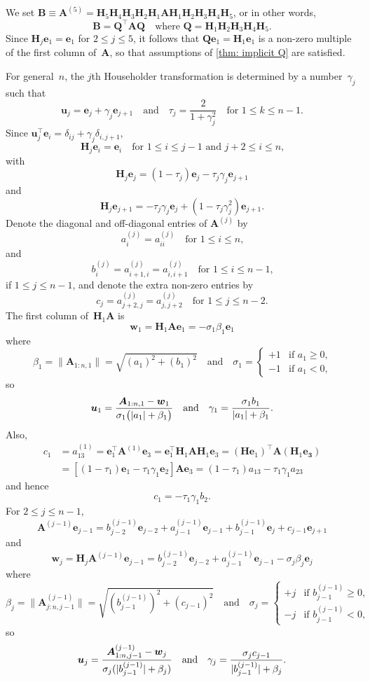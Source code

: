\documentclass[12pt,a4paper]{article}
\newcommand{\bs}[1]{\boldsymbol{#1}}
\begin{document}
We set
$\bs{B}\equiv\bs{A}^{(5)}=\bs{H}_5\bs{H}_4\bs{H}_3\bs{H}_2\bs{H}_1\bs{A}
\bs{H}_1\bs{H}_2\bs{H}_3\bs{H}_4\bs{H}_5$, or in other words,
\[
\bs{B}=\bs{Q}^\top\bs{A}\bs{Q}
	\quad\text{where $\bs{Q}=\bs{H}_1\bs{H}_2\bs{H}_3\bs{H}_4\bs{H}_5$.}
\]
Since $\bs{H}_j\bs{e}_1=\bs{e}_1$ for $2\le j\le 5$, it follows that
$\bs{Q}\bs{e}_1=\bs{H}_1\bs{e}_1$ is a non-zero multiple of the first column 
of~$\bs{A}$, so that assumptions of \cref{thm: implicit Q} are satisfied.

For general~$n$, the $j$th Householder transformation is determined by a
number~$\gamma_j$ such that
\[
\bs{u}_j=\bs{e}_j+\gamma_j\bs{e}_{j+1}
\quad\text{and}\quad
\tau_j=\frac{2}{1+\gamma_j^2}\quad\text{for $1\le k\le n-1$.}
\]
Since $\bs{u}_j^\top\bs{e}_i=\delta_{ij}+\gamma_j\delta_{i,j+1}$,
\[
\bs{H}_j\bs{e}_i=\bs{e}_i\quad\text{for $1\le i\le j-1$ and $j+2\le i\le n$,}
\]
with
\[
\bs{H}_j\bs{e}_j=(1-\tau_j)\bs{e}_j-\tau_j\gamma_j\bs{e}_{j+1}
\]
and
\[
\bs{H}_j\bs{e}_{j+1}=-\tau_j\gamma_j\bs{e}_j+(1-\tau_j\gamma_j^2)\bs{e}_{j+1}.
\]
Denote the diagonal and off-diagonal entries of $\bs{A}^{(j)}$ by
\[
a^{(j)}_i=a^{(j)}_{ii}\quad\text{for $1\le i\le n$,}
\]
and
\[
b^{(j)}_i=a^{(j)}_{i+1,i}=a^{(j)}_{i,i+1}
\quad\text{for $1\le i\le n-1$,}
\]
if $1\le j\le n-1$, and denote the extra non-zero entries by
\[
c_j=a^{(j)}_{j+2,j}=a^{(j)}_{j,j+2}
    \quad\text{for $1\le j\le n-2$.}
\]
The first column of~$\bs{H}_1\bs{A}$ is
\[
\bs{w}_1=\bs{H}_1\bs{A}\bs{e}_1=-\sigma_1\beta_1\bs{e}_1
\]
where
\[
\beta_1=\|\bs{A}_{1:n,1}\|=\sqrt{(a_1)^2+(b_1)^2}\quad\text{and}\quad
\sigma_1=\begin{cases}
+1&\text{if $a_1\ge0$,}\\
-1&\text{if $a_1<0$,}
\end{cases}
\]
so
\[
\bs{u}_1=\frac{\bs{A}_{1:n,1}-\bs{w}_1}{%
\sigma_1\bigl(|a_1|+\beta_1\bigr)}
\quad\text{and}\quad
\gamma_1=\frac{\sigma_1b_1}{|a_1|+\beta_1}.
\]
Also,
\begin{align*}
c_1&=a^{(1)}_{13}=\bs{e}_1^\top\bs{A}^{(1)}\bs{e}_3
    =\bs{e}_1^\top\bs{H}_1\bs{A}\bs{H}_1\bs{e}_3
    =(\bs{H}\bs{e}_1)^\top\bs{A}(\bs{H}_1\bs{e_3})\\
    &=[(1-\tau_1)\bs{e}_1-\tau_1\gamma_1\bs{e}_2]\bs{A}\bs{e}_3
    =(1-\tau_1)a_{13}-\tau_1\gamma_1a_{23}
\end{align*}
and hence
\[
c_1=-\tau_1\gamma_1b_2.
\]
For $2\le j\le n-1$, 
\[
\bs{A}^{(j-1)}\bs{e}_{j-1}=b^{(j-1)}_{j-2}\bs{e}_{j-2}
    +a^{(j-1)}_{j-1}\bs{e}_{j-1}+b^{(j-1)}_{j-1}\bs{e}_j+c_{j-1}\bs{e}_{j+1}
\]
and
\[
\bs{w}_j=\bs{H}_j\bs{A}^{(j-1)}\bs{e}_{j-1}
    =b^{(j-1)}_{j-2}\bs{e}_{j-2}+a^{(j-1)}_{j-1}\bs{e}_{j-1}
    -\sigma_j\beta_j\bs{e}_j
\]
where
\[
\beta_j=\|\bs{A}^{(j-1)}_{j:n,j-1}\|=\sqrt{(b^{(j-1)}_{j-1})^2+(c_{j-1})^2}
\quad\text{and}\quad
\sigma_j=\begin{cases}
+j&\text{if $b^{(j-1)}_{j-1}\ge0$,}\\
-j&\text{if $b^{(j-1)}_{j-1}<0$,}
\end{cases}
\]
so
\[
\bs{u}_j=\frac{\bs{A}^{(j-1)}_{1:n,j-1}-\bs{w}_j}{%
\sigma_j(|b^{(j-1)}_{j-1}|+\beta_j)}
\quad\text{and}\quad
\gamma_j=\frac{\sigma_jc_{j-1}}{|b^{(j-1)}_{j-1}|+\beta_j}.
\]
\end{document}
